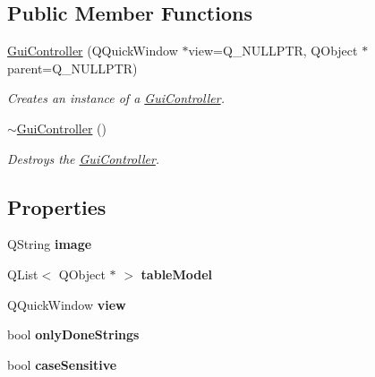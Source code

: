 \subsection*{Public Member Functions}
\begin{DoxyCompactItemize}
\item 
\mbox{\hyperlink{classGuiController_a853ee45214496ae1e59cd0139ecd1552}{Gui\+Controller}} (Q\+Quick\+Window $\ast$view=Q\+\_\+\+N\+U\+L\+L\+P\+TR, Q\+Object $\ast$parent=Q\+\_\+\+N\+U\+L\+L\+P\+TR)
\begin{DoxyCompactList}\small\item\em Creates an instance of a \mbox{\hyperlink{classGuiController}{Gui\+Controller}}. \end{DoxyCompactList}\item 
\mbox{\label{classGuiController_a5b3332300c60a28c1f97a28ef51bac43}} 
\mbox{\hyperlink{classGuiController_a5b3332300c60a28c1f97a28ef51bac43}{$\sim$\+Gui\+Controller}} ()
\begin{DoxyCompactList}\small\item\em Destroys the \mbox{\hyperlink{classGuiController}{Gui\+Controller}}. \end{DoxyCompactList}\end{DoxyCompactItemize}
\subsection*{Properties}
\begin{DoxyCompactItemize}
\item 
\mbox{\label{classGuiController_a10a671bf27008ab3e60e62b2106f8275}} 
Q\+String {\bfseries image}
\item 
\mbox{\label{classGuiController_a2ce97d522206f2adf3d38eb534f76d16}} 
Q\+List$<$ Q\+Object $\ast$ $>$ {\bfseries table\+Model}
\item 
\mbox{\label{classGuiController_ad588a1633d6df3e17673232bc8a548dd}} 
Q\+Quick\+Window {\bfseries view}
\item 
\mbox{\label{classGuiController_a9130c47e3ab1205ed9c5a12a8afa9ec3}} 
bool {\bfseries only\+Done\+Strings}
\item 
\mbox{\label{classGuiController_acf4e341b4f9b6c3c383c58531c494ecf}} 
bool {\bfseries case\+Sensitive}
\end{DoxyCompactItemize}
